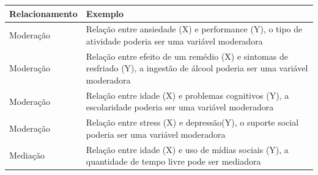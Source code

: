 \documentclass[
]{book}
\begin{document}
\begin{longtable}[]{@{}ll@{}}
\toprule
\begin{minipage}[b]{0.10\columnwidth}\raggedright
Relacionamento\strut
\end{minipage} & \begin{minipage}[b]{0.84\columnwidth}\raggedright
Exemplo\strut
\end{minipage}\tabularnewline
\midrule
\endhead
\begin{minipage}[t]{0.10\columnwidth}\raggedright
Moderação\strut
\end{minipage} & \begin{minipage}[t]{0.84\columnwidth}\raggedright
Relação entre ansiedade (X) e performance (Y), o tipo de atividade
poderia ser uma variável moderadora\strut
\end{minipage}\tabularnewline
\begin{minipage}[t]{0.10\columnwidth}\raggedright
Moderação\strut
\end{minipage} & \begin{minipage}[t]{0.84\columnwidth}\raggedright
Relação entre efeito de um remédio (X) e sintomas de resfriado (Y), a
ingestão de álcool poderia ser uma variável moderadora\strut
\end{minipage}\tabularnewline
\begin{minipage}[t]{0.10\columnwidth}\raggedright
Moderação\strut
\end{minipage} & \begin{minipage}[t]{0.84\columnwidth}\raggedright
Relação entre idade (X) e problemas cognitivos (Y), a escolaridade
poderia ser uma variável moderadora\strut
\end{minipage}\tabularnewline
\begin{minipage}[t]{0.10\columnwidth}\raggedright
Moderação\strut
\end{minipage} & \begin{minipage}[t]{0.84\columnwidth}\raggedright
Relação entre stress (X) e depressão(Y), o suporte social poderia ser
uma variável moderadora\strut
\end{minipage}\tabularnewline
\begin{minipage}[t]{0.10\columnwidth}\raggedright
Mediação\strut
\end{minipage} & \begin{minipage}[t]{0.84\columnwidth}\raggedright
Relação entre idade (X) e uso de mídias sociais (Y), a quantidade de
tempo livre pode ser mediadora\strut
\end{minipage}\tabularnewline

\end{longtable}
\end{document}

